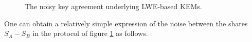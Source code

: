 \begin{figure}\label{fig: LWE-Approx-Exchange}
	\begin{minipage}{.3\linewidth}
	\end{minipage}\hfill
	\begin{minipage}{.3\linewidth}
	\end{minipage}
	\hfill
		\begin{minipage}{.3\linewidth}
	\end{minipage}
	\begin{minipage}{.3\linewidth}
	\end{minipage}\hfill
	\begin{minipage}{.3\linewidth}
	\end{minipage}
	\caption{
		The noisy key agreement underlying LWE-based KEMs.}
\end{figure}

One can obtain a relatively simple expression of the noise between the shares $S_A - S_B$ in the protocol of figure \ref{fig: LWE-Approx-Exchange} as follows.

